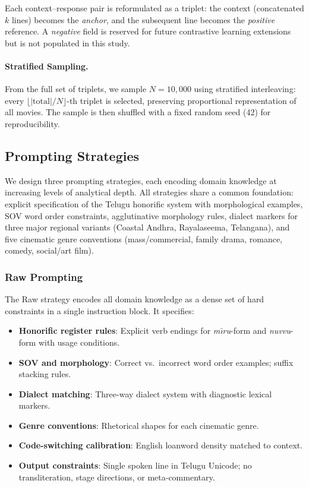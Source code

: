 \documentclass[11pt]{article}
\begin{document}
Each context--response pair is reformulated as a triplet: the context (concatenated $k$ lines) becomes the \textit{anchor}, and the subsequent line becomes the \textit{positive} reference. A \textit{negative} field is reserved for future contrastive learning extensions but is not populated in this study.

\paragraph{Stratified Sampling.}
From the full set of triplets, we sample $N = 10{,}000$ using stratified interleaving: every $\lfloor |\text{total}| / N\rfloor$-th triplet is selected, preserving proportional representation of all movies. The sample is then shuffled with a fixed random seed (42) for reproducibility.

\subsection{Prompting Strategies}
\label{subsec:prompting}

We design three prompting strategies, each encoding domain knowledge at increasing levels of analytical depth. All strategies share a common foundation: explicit specification of the Telugu honorific system with morphological examples, SOV word order constraints, agglutinative morphology rules, dialect markers for three major regional variants (Coastal Andhra, Rayalaseema, Telangana), and five cinematic genre conventions (mass/commercial, family drama, romance, comedy, social/art film).

\subsubsection{Raw Prompting}
\label{subsubsec:raw}

The Raw strategy encodes all domain knowledge as a dense set of hard constraints in a single instruction block. It specifies:

\begin{itemize}[leftmargin=*,itemsep=1pt]
    \item \textbf{Honorific register rules}: Explicit verb endings for \textit{m\={\i}ru}-form and \textit{nuvvu}-form with usage conditions.
    \item \textbf{SOV and morphology}: Correct vs.\ incorrect word order examples; suffix stacking rules.
    \item \textbf{Dialect matching}: Three-way dialect system with diagnostic lexical markers.
    \item \textbf{Genre conventions}: Rhetorical shapes for each cinematic genre.
    \item \textbf{Code-switching calibration}: English loanword density matched to context.
    \item \textbf{Output constraints}: Single spoken line in Telugu Unicode; no transliteration, stage directions, or meta-commentary.
\end{itemize}
\end{document}
